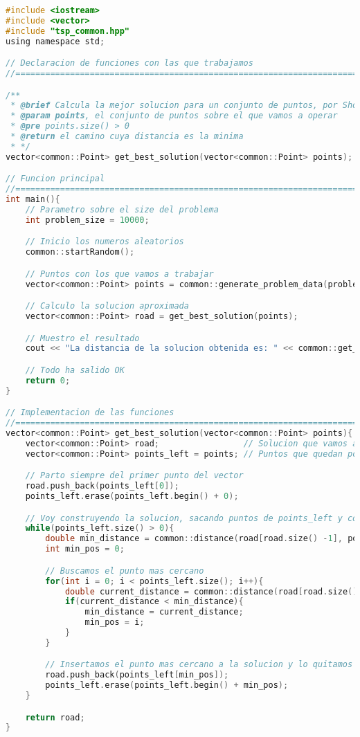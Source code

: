 \documentclass[10pt, a4paper]{article}
\theoremstyle{theorem-style}
\theoremstyle{theorem-style}
\theoremstyle{definition-style}
\theoremstyle{remark-style}
\theoremstyle{example-style}
\theoremstyle{definition-style}
\theoremstyle{remark-style}
\begin{document}
\begin{lstlisting}[language=C]
#include <iostream>
#include <vector>
#include "tsp_common.hpp"
using namespace std;

// Declaracion de funciones con las que trabajamos
//==============================================================================

/**
 * @brief Calcula la mejor solucion para un conjunto de puntos, por Shortest Neighbor First
 * @param points, el conjunto de puntos sobre el que vamos a operar
 * @pre points.size() > 0
 * @return el camino cuya distancia es la minima
 * */
vector<common::Point> get_best_solution(vector<common::Point> points);

// Funcion principal
//==============================================================================
int main(){
    // Parametro sobre el size del problema
    int problem_size = 10000;

    // Inicio los numeros aleatorios
    common::startRandom();

    // Puntos con los que vamos a trabajar
    vector<common::Point> points = common::generate_problem_data(problem_size);

    // Calculo la solucion aproximada
    vector<common::Point> road = get_best_solution(points);

    // Muestro el resultado
    cout << "La distancia de la solucion obtenida es: " << common::get_road_distance(road) << endl;

    // Todo ha salido OK
    return 0;
}

// Implementacion de las funciones 
//==============================================================================
vector<common::Point> get_best_solution(vector<common::Point> points){
    vector<common::Point> road;                 // Solucion que vamos a construir
    vector<common::Point> points_left = points; // Puntos que quedan por insertar a la solucion

    // Parto siempre del primer punto del vector
    road.push_back(points_left[0]);
    points_left.erase(points_left.begin() + 0);

    // Voy construyendo la solucion, sacando puntos de points_left y colocandolos en road
    while(points_left.size() > 0){
        double min_distance = common::distance(road[road.size() -1], points_left[0]);
        int min_pos = 0;

        // Buscamos el punto mas cercano
        for(int i = 0; i < points_left.size(); i++){
            double current_distance = common::distance(road[road.size() -1], points_left[i]);
            if(current_distance < min_distance){
                min_distance = current_distance;
                min_pos = i;
            }
        }

        // Insertamos el punto mas cercano a la solucion y lo quitamos de los puntos que faltan
        road.push_back(points_left[min_pos]);
        points_left.erase(points_left.begin() + min_pos);
    }

    return road;
}
\end{lstlisting}
\end{document}
